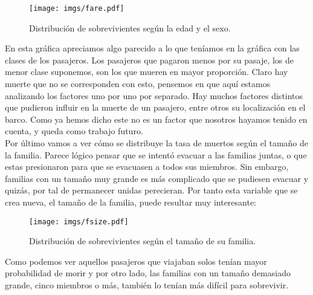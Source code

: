 \begin{figure}[H]
  \centering
  \texttt{[image: imgs/fare.pdf]}
  \caption{Distribución de sobrevivientes según la edad y el sexo.}
\end{figure}

En esta gráfica apreciamos algo parecido a lo que teníamos en la gráfica con las clases de los pasajeros. Los pasajeros que pagaron menos por su pasaje, los de menor clase suponemos, son los que mueren en mayor proporción. Claro hay muerte que no se corresponden con esto, pensemos en que aquí estamos analizando los factores uno por uno por separado. Hay muchos factores distintos que pudieron influir en la muerte de un pasajero, entre otros su localización en el barco. Como ya hemos dicho este no es un factor que nosotros hayamos tenido en cuenta, y queda como trabajo futuro.\\

Por último vamos a ver cómo se distribuye la tasa de muertos según el tamaño de la familia. Parece lógico pensar que se intentó evacuar a las familias juntas, o que estas presionaron para que se evacuasen a todos sus miembros. Sin embargo, familias con un tamaño muy grande es más complicado que se pudiesen evacuar y quizás, por tal de permanecer unidas perecieran. Por tanto esta variable que se crea nueva, el tamaño de la familia, puede resultar muy interesante:

\begin{figure}[H]
  \centering
  \texttt{[image: imgs/fsize.pdf]}
  \caption{Distribución de sobrevivientes según el tamaño de su familia.}
\end{figure}

Como podemos ver aquellos pasajeros que viajaban solos tenían mayor probabilidad de morir y por otro lado, las familias con un tamaño demasiado grande, cinco miembros o más, también lo tenían más difícil para sobrevivir.

